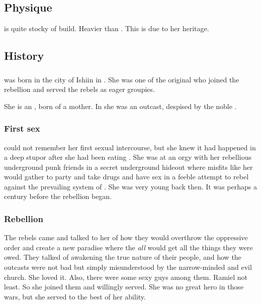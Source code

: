 \subsection{Physique}
\Achsah{} is quite stocky of build. 
Heavier than \Teshrial. 
This is due to her \nephilic{} heritage. 







\subsection{History}





\subsubsection{\Merkyrah}
\Achsah{} was born in the city of Ishiin in \Merkyrah. 
She was one of the original  who joined the rebellion and served the rebels as eager groupies. 

She is an \quo{\ashenblood}, born of a \nephilic{} mother. 
In \Merkyrah{} she was an outcast, despised by the noble \resphain. 





\subsubsection{First sex}
\Achsah could not remember her first sexual intercourse, but she knew it had happened in a deep stupor after she had been eating . 
She was at an orgy with her rebellious underground \bezed punk friends in a secret underground hideout where misfits like her would gather to party and take drugs and have sex in a feeble attempt to rebel against the prevailing system of \Merkyrah. 
She was very young back then.
It was perhaps a century before the rebellion began. 





\subsubsection{Rebellion}
The rebels came and talked to her of how they would overthrow the oppressive order and create a new paradise where the \resphain\dash \emph{all} \resphain\dash would get all the things they were owed. 
They talked of awakening the true nature of their people, and how the outcasts were not bad but simply misunderstood by the narrow-minded and evil church. 
She loved it. 
Also, there were some sexy guys among them. 
Ramiel not least. 
So she joined them and willingly served. 
She was no great hero in those wars, but she served to the best of her ability. 





